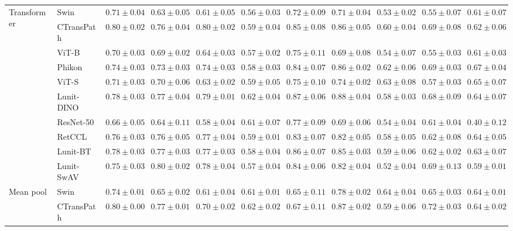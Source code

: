 \begin{tabular}{ll|cccc|c|cccc}
\cline{1-11}
\multirow[t]{10}{*}{Transformer} & Swin & $0.71 \pm 0.04$ & $0.63 \pm 0.05$ & $0.61 \pm 0.05$ & $0.56 \pm 0.03$ & $0.72 \pm 0.09$ & $0.71 \pm 0.04$ & $0.53 \pm 0.02$ & $0.55 \pm 0.07$ & $0.61 \pm 0.07$ \\
 & CTransPath & $\mathbf{0.80 \pm 0.02}$ & $0.76 \pm 0.04$ & $\mathbf{0.80 \pm 0.02}$ & $0.59 \pm 0.04$ & $0.85 \pm 0.08$ & $0.86 \pm 0.05$ & $0.60 \pm 0.04$ & $0.69 \pm 0.08$ & $0.62 \pm 0.06$ \\
 & ViT-B & $0.70 \pm 0.03$ & $0.69 \pm 0.02$ & $0.64 \pm 0.03$ & $0.57 \pm 0.02$ & $0.75 \pm 0.11$ & $0.69 \pm 0.08$ & $0.54 \pm 0.07$ & $0.55 \pm 0.03$ & $0.61 \pm 0.03$ \\
 & Phikon & $0.74 \pm 0.03$ & $0.73 \pm 0.03$ & $0.74 \pm 0.03$ & $0.58 \pm 0.03$ & $0.84 \pm 0.07$ & $0.86 \pm 0.02$ & $0.62 \pm 0.06$ & $0.69 \pm 0.03$ & $\mathbf{0.67 \pm 0.04}$ \\
 & ViT-S & $0.71 \pm 0.03$ & $0.70 \pm 0.06$ & $0.63 \pm 0.02$ & $0.59 \pm 0.05$ & $0.75 \pm 0.10$ & $0.74 \pm 0.02$ & $\mathbf{0.63 \pm 0.08}$ & $0.57 \pm 0.03$ & $0.65 \pm 0.07$ \\
 & Lunit-DINO & $0.78 \pm 0.03$ & $0.77 \pm 0.04$ & $0.79 \pm 0.01$ & $\mathbf{0.62 \pm 0.04}$ & $\mathbf{0.87 \pm 0.06}$ & $\mathbf{0.88 \pm 0.04}$ & $0.58 \pm 0.03$ & $0.68 \pm 0.09$ & $0.64 \pm 0.07$ \\
 & ResNet-50 & $0.66 \pm 0.05$ & $0.64 \pm 0.11$ & $0.58 \pm 0.04$ & $0.61 \pm 0.07$ & $0.77 \pm 0.09$ & $0.69 \pm 0.06$ & $0.54 \pm 0.04$ & $0.61 \pm 0.04$ & $0.40 \pm 0.12$ \\
 & RetCCL & $0.76 \pm 0.03$ & $0.76 \pm 0.05$ & $0.77 \pm 0.04$ & $0.59 \pm 0.01$ & $0.83 \pm 0.07$ & $0.82 \pm 0.05$ & $0.58 \pm 0.05$ & $0.62 \pm 0.08$ & $0.64 \pm 0.05$ \\
 & Lunit-BT & $0.78 \pm 0.03$ & $0.77 \pm 0.03$ & $0.77 \pm 0.03$ & $0.58 \pm 0.04$ & $0.86 \pm 0.07$ & $0.85 \pm 0.03$ & $0.59 \pm 0.06$ & $0.62 \pm 0.02$ & $0.63 \pm 0.07$ \\
 & Lunit-SwAV & $0.75 \pm 0.03$ & $\mathbf{0.80 \pm 0.02}$ & $0.78 \pm 0.04$ & $0.57 \pm 0.04$ & $0.84 \pm 0.06$ & $0.82 \pm 0.04$ & $0.52 \pm 0.04$ & $\mathbf{0.69 \pm 0.13}$ & $0.59 \pm 0.01$ \\
\cline{1-11}
\multirow[t]{10}{*}{Mean pool} & Swin & $0.74 \pm 0.01$ & $0.65 \pm 0.02$ & $0.61 \pm 0.04$ & $0.61 \pm 0.01$ & $0.65 \pm 0.11$ & $0.78 \pm 0.02$ & $0.64 \pm 0.04$ & $0.65 \pm 0.03$ & $0.64 \pm 0.01$ \\
 & CTransPath & $\mathbf{0.80 \pm 0.00}$ & $\mathbf{0.77 \pm 0.01}$ & $\mathbf{0.70 \pm 0.02}$ & $\mathbf{0.62 \pm 0.02}$ & $0.67 \pm 0.11$ & $0.87 \pm 0.02$ & $0.59 \pm 0.06$ & $0.72 \pm 0.03$ & $0.64 \pm 0.02$ \\

\end{tabular}
